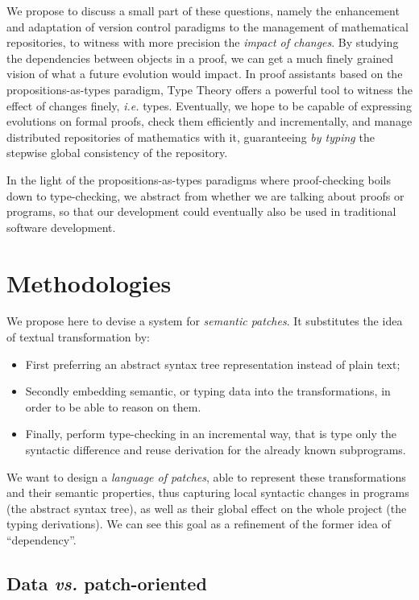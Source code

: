 \documentclass{article}
\begin{document}
We propose to discuss a small part of these questions, namely the
enhancement and adaptation of version control paradigms to the
management of mathematical repositories, to witness with more
precision the \emph{impact of changes}. By studying the dependencies
between objects in a proof, we can get a much finely grained vision of
what a future evolution would impact. In proof assistants based on the
propositions-as-types paradigm, Type Theory offers a powerful tool to
witness the effect of changes finely, \emph{i.e.} types. Eventually,
we hope to be capable of expressing evolutions on formal proofs, check
them efficiently and incrementally, and manage distributed
repositories of mathematics with it, guaranteeing \emph{by typing} the
stepwise global consistency of the repository.

In the light of the propositions-as-types paradigms where
proof-checking boils down to type-checking, we abstract from whether
we are talking about proofs or programs, so that our development could
eventually also be used in traditional software development.

\section{Methodologies}

We propose here to devise a system for \emph{semantic patches}. It
substitutes the idea of textual transformation by:
\begin{itemize}
\item First preferring an abstract syntax tree representation instead
  of plain text;
\item Secondly embedding semantic, or typing data into the
  transformations, in order to be able to reason on them.
\item Finally, perform type-checking in an incremental way, that is
  type only the syntactic difference and reuse derivation for the
  already known subprograms.
\end{itemize}

We want to design a \emph{language of patches}, able to represent
these transformations and their semantic properties, thus capturing
local syntactic changes in programs (the abstract syntax tree), as
well as their global effect on the whole project (the typing
derivations). We can see this goal as a refinement of the former idea
of ``dependency''.

\subsection{Data \emph{vs.} patch-oriented}
\end{document}
